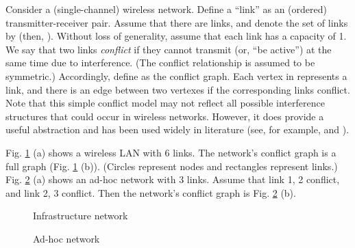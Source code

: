 \documentclass{IEEEtran}
\begin{document}
Consider a (single-channel) wireless network. Define a {}``link''
as an (ordered) transmitter-receiver pair. Assume that there are 
links, and denote the set of links by  (then, ).
Without loss of generality, assume that each link has a capacity of
1. We say that two links \emph{conflict} if they cannot transmit (or,
{}``be active'') at the same time due to interference. (The conflict
relationship is assumed to be symmetric.) Accordingly, define 
as the conflict graph. Each vertex in  represents a link, and
there is an edge between two vertexes if the corresponding links conflict.
Note that this simple conflict model may not reflect all possible
interference structures that could occur in wireless networks. However,
it does provide a useful abstraction and has been used widely in literature
(see, for example, \cite{Kar} and \cite{tutorial}). \begin{comment}
Also, it is general enough to be used in other resource sharing problems.
An example is provided in the next section.
\end{comment}
{} \begin{comment}
Further assume that there is no loss of packets due to channel fading.
\end{comment}
{}

Fig. \ref{fig:WLAN} (a) shows a wireless LAN with 6 links. The network's
conflict graph is a full graph (Fig. \ref{fig:WLAN} (b)). (Circles
represent nodes and rectangles represent links.) Fig. \ref{fig:Ad-hoc}
(a) shows an ad-hoc network with 3 links. Assume that link 1, 2 conflict,
and link 2, 3 conflict. Then the network's conflict graph is Fig.
\ref{fig:Ad-hoc} (b). \begin{figure}
\begin{centering}
 
\par\end{centering}

\caption{\label{fig:WLAN}Infrastructure network}

\end{figure}
\begin{figure}
\begin{centering}
 
\par\end{centering}

\caption{\label{fig:Ad-hoc}Ad-hoc network}

\end{figure}
\medskip{}
\end{document}

